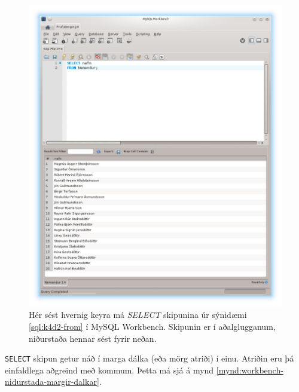 \begin{figure}
\caption[Niðurstöður SELECT í Workbench]{Hér sést hvernig keyra má \emph{SELECT} skipunina úr sýnidæmi \ref{sql:k4d2-from} í MySQL Workbench. Skipunin er í aðalglugganum, niðurstaða hennar sést fyrir neðan.}
\label{mynd:workbench-select}
\centering
\includegraphics[width=\linewidth]{myndir/workbench-select}
\end{figure}

\verb|SELECT| skipun getur náð í marga dálka (eða mörg atriði) í einu. Atriðin eru þá einfaldlega aðgreind með kommum. Þetta má sjá á mynd \ref{mynd:workbench-nidurstada-margir-dalkar}.

